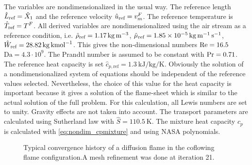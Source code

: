 The variables are nondimensionalized in the usual way. The reference length $\hat L_{\text{ref}} = \hat{X}_1$ and the reference velocity $\hat u_{\text{ref}} =v^F_m$. The reference temperature is $\hat T_{\text{ref}} = T^F$.  All derived variables are nondimensionalized using the air stream as a reference condition, i.e. $\hat \rho_{\text{ref}} = \SI{1.17}{\kilo \gram \per \cubic \meter}$, $\hat \mu_{\text{ref}} = \SI{1.85e-5}{\kilo \gram \per \meter \per \second}$,$\hat W_{\text{ref}} = \SI{28.82}{\kilo \gram \per \kilo\mole}$. This gives the non-dimensional numbers $\text{Re} = 16.5$ $\text{Da} = 4.3\cdot 10^9$. The Prandtl number is assumed to be constant with $\text{Pr} = 0.71$. The reference heat capacity is set $\hat{c}_{p,\text{ref}}= \SI{1.3}{\kilo \joule \per \kilo \gram \per \kelvin}$. Obviously the solution of a nondimensionalized system of equations should be independent of the reference values selected. Nevertheless, the choice of this value for the heat capacity is important because it gives a solution of the flame-sheet which is similar to the actual solution of the full problem. For this calculation, all Lewis numbers are set to unity. Gravity effects are not taken into account. The transport parameters are calculated using Sutherland law with $\hat{S} = \SI{110.5}{\kelvin}$. The mixture heat capacity $c_p$ is calculated with \cref{eq:nondim_cpmixture} and using NASA polynomials.
\begin{figure}[t!]
	\centering
	\caption{Typical convergence history of a diffusion flame in the coflowing flame configuration.A mesh refinement was done at iteration 21. }
	\label{fig:CoFlow_ConvergenceStory}
\end{figure}

